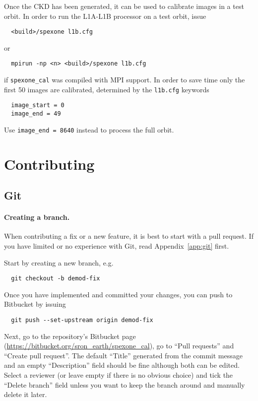 \documentclass{article}
\begin{document}
Once the CKD has been generated, it can be used to calibrate images in a test orbit. In order to run the L1A-L1B processor on a test orbit, issue
\begin{lstlisting}
  <build>/spexone l1b.cfg
\end{lstlisting}
or
\begin{lstlisting}
  mpirun -np <n> <build>/spexone l1b.cfg
\end{lstlisting}
if \lstinline!spexone_cal! was compiled with MPI support. In order to save time only the first 50 images are calibrated, determined by the \lstinline!l1b.cfg! keywords
\begin{lstlisting}
  image_start = 0
  image_end = 49
\end{lstlisting}
Use \lstinline!image_end = 8640! instead to process the full orbit.

\section{Contributing}

\subsection{Git}

\paragraph{Creating a branch.} When contributing a fix or a new feature, it is best to start with a pull request. If you have limited or no experience with Git, read Appendix~\ref{app:git} first.

Start by creating a new branch, e.g.
\begin{lstlisting}
  git checkout -b demod-fix
\end{lstlisting}
Once you have implemented and committed your changes, you can push to Bitbucket by issuing
\begin{lstlisting}
  git push --set-upstream origin demod-fix
\end{lstlisting}
Next, go to the repository's Bitbucket page (\url{https://bitbucket.org/sron_earth/spexone_cal}), go to ``Pull requests'' and ``Create pull request''. The default ``Title'' generated from the commit message and an empty ``Description'' field should be fine although both can be edited. Select a reviewer (or leave empty if there is no obvious choice) and tick the ``Delete branch'' field unless you want to keep the branch around and manually delete it later.
\end{document}
